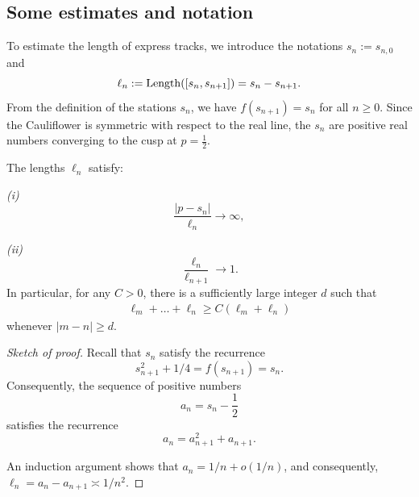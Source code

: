\subsection{Some estimates and notation}

To estimate the length of express tracks, we introduce the notations $s_n := s_{n, 0}$ and 
\begin{equation}
	\ell_n := \operatorname{Length}([s_{n},s_{n+1}]) = s_{n}-s_{n+1}.
\end{equation}
From the definition of the stations $s_n$, we have $f(s_{n+1}) = s_n$ for all $n \ge 0$. Since the Cauliflower is symmetric with respect to the real line, the $s_n$ are positive real numbers converging to the cusp at $p = \frac{1}{2}$.

\begin{lemma} \label{lem-ell_n}
	The lengths ${\ell_n}$ satisfy:
	
	{\em (i)}
	\begin{equation}
	\label{eq:ell_n1}
		\frac {|p-s_n|}{\ell_n} \to \infty,
	\end{equation}
	
	{\em (ii)}
	\begin{equation}
	\label{eq:ell_n2}
		\frac{\ell_n}{\ell_{n+1}} \to 1.
	\end{equation}
	In particular, for any $C > 0$, there is a sufficiently large integer $d$ such that
	\begin{align*}
		\ell_{m}+\ldots+\ell_{n} \geq C (\ell_m+\ell_n)
	\end{align*}
	whenever $|m-n| \geq d$.
\end{lemma}

\begin{proof}[Sketch of proof] Recall that $s_n$ satisfy the recurrence
\begin{equation}
s_{n+1}^2 + 1/4 =f(s_{n+1})= s_n.
\end{equation}
Consequently, 
the sequence of positive numbers
$$
a_n = s_n-\frac{1}{2}
$$
satisfies the recurrence 
\begin{equation}
a_n = a_{n+1}^2+a_{n+1}.
\end{equation}

An induction argument shows that $a_n = 1/n + o(1/n)$, and consequently, $\ell_n = a_n - a_{n+1} \asymp 1/n^2$.
\end{proof}


